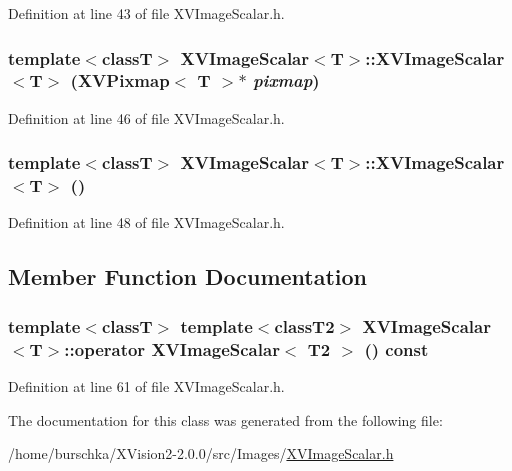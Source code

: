 Definition at line 43 of file XVImage\-Scalar.h.\label{XVImageScalar_a2}
\hypertarget{class_XVImageScalar_a2}{
\subsubsection[XVImageScalar]{\setlength{\rightskip}{0pt plus 5cm}template$<$classT$>$ XVImage\-Scalar$<$T$>$::XVImage\-Scalar$<$T$>$ (XVPixmap$<$ T $>$$\ast$ {\em pixmap})}}




Definition at line 46 of file XVImage\-Scalar.h.\label{XVImageScalar_a3}
\hypertarget{class_XVImageScalar_a3}{
\subsubsection[XVImageScalar]{\setlength{\rightskip}{0pt plus 5cm}template$<$classT$>$ XVImage\-Scalar$<$T$>$::XVImage\-Scalar$<$T$>$ ()}}




Definition at line 48 of file XVImage\-Scalar.h.

\subsection{Member Function Documentation}
\label{XVImageScalar_a13}
\hypertarget{class_XVImageScalar_a13}{
\subsubsection[operator XVImageScalar]{\setlength{\rightskip}{0pt plus 5cm}template$<$classT$>$  template$<$classT2$>$ XVImage\-Scalar$<$T$>$::operator XVImage\-Scalar$<$ T2 $>$ () const}}




Definition at line 61 of file XVImage\-Scalar.h.

The documentation for this class was generated from the following file:\begin{CompactItemize}
\item 
/home/burschka/XVision2-2.0.0/src/Images/\hyperlink{XVImageScalar.h-source}{XVImage\-Scalar.h}\end{CompactItemize}

